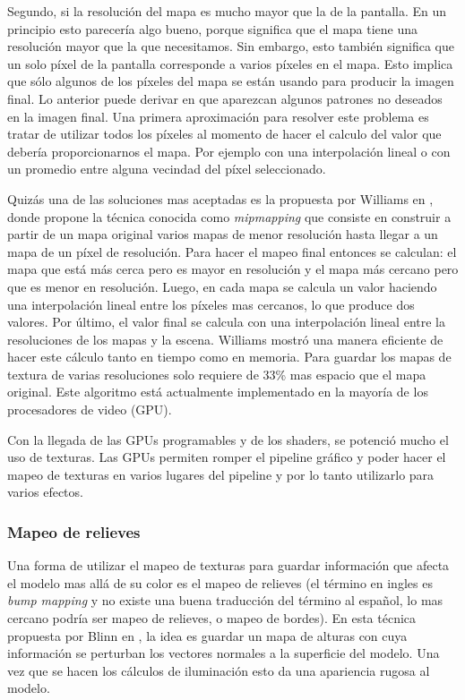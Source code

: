 Segundo, si la resolución del mapa es mucho mayor que la de la pantalla. En un principio esto parecería algo bueno, porque significa que el mapa tiene una resolución mayor que la que necesitamos. Sin embargo, esto también significa que un solo píxel de la pantalla corresponde a varios píxeles en el mapa. Esto implica que sólo algunos de los píxeles del mapa se están usando para producir la imagen final. Lo anterior puede derivar en que aparezcan algunos patrones no deseados en la imagen final. Una primera aproximación para resolver este problema es tratar de utilizar todos los píxeles al momento de hacer el calculo del valor que debería proporcionarnos el mapa. Por ejemplo con una interpolación lineal o con un promedio entre alguna vecindad del píxel seleccionado.

Quizás una de las soluciones mas aceptadas es la propuesta por Williams en \cite{mipmapping}, donde propone la técnica conocida como \emph{mipmapping} que consiste en construir a partir de un mapa original varios mapas de menor resolución hasta llegar a un mapa de un píxel de resolución. Para hacer el mapeo final entonces se calculan: el mapa que está más cerca pero es mayor en resolución y el mapa más cercano pero que es menor en resolución. Luego, en cada mapa se calcula un valor haciendo una interpolación lineal entre los píxeles mas cercanos, lo que produce dos valores. Por último, el valor final se calcula con una interpolación lineal entre la resoluciones de los mapas y la escena. Williams mostró una manera eficiente de hacer este cálculo tanto en tiempo como en memoria. Para guardar los mapas de textura de varias resoluciones solo requiere de 33\% mas espacio que el mapa original. Este algoritmo está actualmente implementado en la mayoría de los procesadores de video (GPU).

Con la llegada de las GPUs programables y de los shaders, se potenció mucho el uso de texturas. Las GPUs permiten romper el pipeline gráfico y poder hacer el mapeo de texturas en varios lugares del pipeline y por lo tanto utilizarlo para varios efectos.

\subsubsection{Mapeo de relieves}

Una forma de utilizar el mapeo de texturas para guardar información que afecta el modelo mas allá de su color es el mapeo de relieves (el término en ingles es \emph{bump mapping} y no existe una buena traducción del término al español, lo mas cercano podría ser mapeo de relieves, o mapeo de bordes). En esta técnica propuesta por Blinn en \cite{bumpmapping}, la idea es guardar un mapa de alturas con cuya información se perturban los vectores normales a la superficie del modelo. Una vez que se hacen los cálculos de iluminación esto da una apariencia rugosa al modelo.

